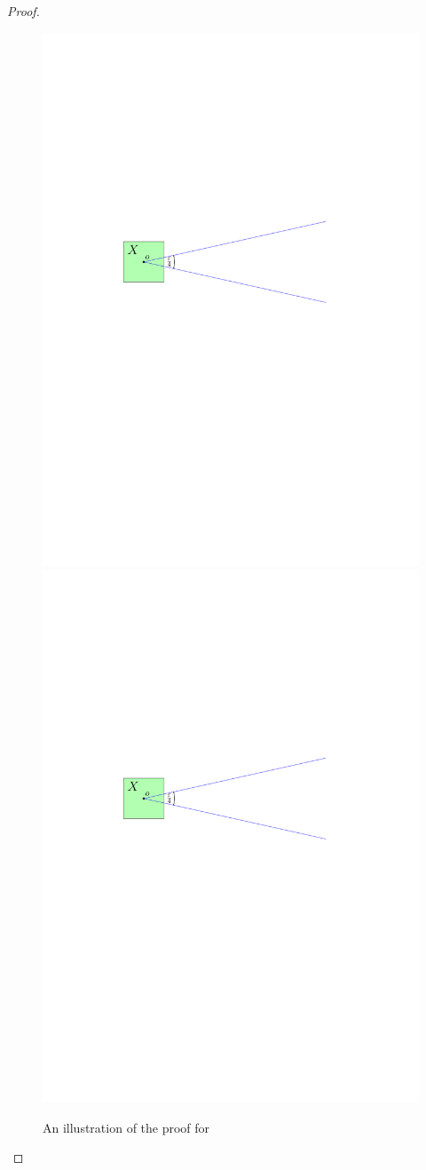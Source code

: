 \begin{proof}
    \begin{figure}[h]
    \phantom{}\hfill%
    \includegraphics[page=2, width=0.48\linewidth]{figs/double_wedge}%
    \hfill%
    \includegraphics[page=3, width=0.48\linewidth]{figs/double_wedge}%
    \hfill%
    \phantom{}%
    \caption{An illustration of the proof for }
\end{figure}


\end{proof}
